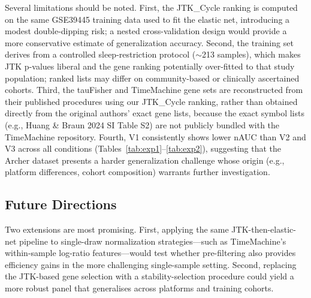 \documentclass[10pt,a4paper]{article}
\begin{document}
Several limitations should be noted.
First, the JTK\_Cycle ranking is computed on the same GSE39445
training data used to fit the elastic net, introducing a modest
double-dipping risk;
a nested cross-validation design would provide a
more conservative estimate of generalization accuracy.
Second, the training set derives from a controlled sleep-restriction
protocol (${\sim}$213 samples), which makes JTK p-values liberal and
the gene ranking potentially over-fitted to that study population;
ranked lists may differ on community-based or clinically ascertained
cohorts.
Third, the tauFisher and TimeMachine gene sets are reconstructed from
their published procedures using our JTK\_Cycle ranking, rather than
obtained directly from the original authors' exact gene lists, because
the exact symbol lists (e.g., Huang \& Braun 2024 SI Table S2) are
not publicly bundled with the TimeMachine repository.
Fourth, V1 consistently shows lower nAUC than V2 and V3 across all
conditions (Tables~\ref{tab:exp1}--\ref{tab:exp2}), suggesting that
the Archer dataset presents a harder generalization challenge whose
origin (e.g., platform differences, cohort composition) warrants
further investigation.

\subsection{Future Directions}

Two extensions are most promising.
First, applying the same JTK-then-elastic-net pipeline to
single-draw normalization strategies---such as TimeMachine's
within-sample log-ratio features---would test whether pre-filtering
also provides efficiency gains in the more challenging single-sample
setting.
Second, replacing the JTK-based gene selection with a
stability-selection procedure \citep{Meinshausen2010} could yield a
more robust panel that generalises across platforms and training
cohorts.
\end{document}
